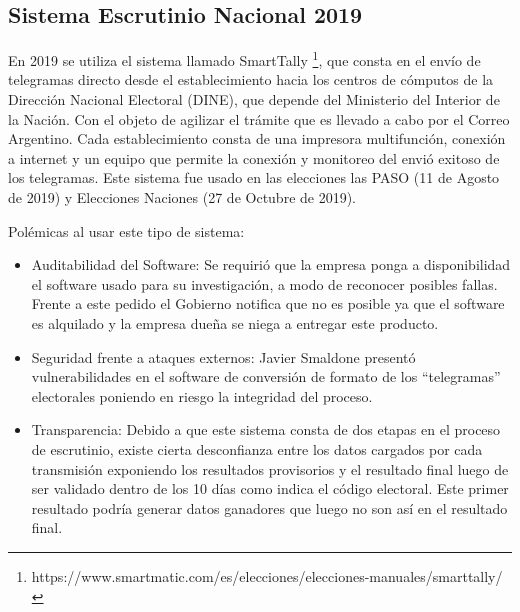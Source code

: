 \subsection{Sistema Escrutinio Nacional 2019}
En 2019 se utiliza el sistema llamado SmartTally \footnote{https://www.smartmatic.com/es/elecciones/elecciones-manuales/smarttally/}, que consta en el envío de telegramas directo desde el establecimiento hacia los centros de cómputos de la Dirección Nacional Electoral (DINE), que depende del Ministerio del Interior de la Nación. Con el objeto de agilizar el trámite que es llevado a cabo por el Correo Argentino. Cada establecimiento consta de una impresora multifunción, conexión a internet y un equipo que permite la conexión y monitoreo del envió exitoso de los telegramas. \newline
Este sistema fue usado en las elecciones las PASO (11 de Agosto de 2019) y Elecciones Naciones (27 de Octubre de 2019).

Polémicas al usar este tipo de sistema:
\begin{itemize}
    \item Auditabilidad del Software: Se requirió que la empresa ponga a disponibilidad el software usado para su investigación, a modo de reconocer posibles fallas. Frente a este pedido el Gobierno notifica que no es posible ya que el software es alquilado y la empresa dueña se niega a entregar este producto.\cite{auditabilidadSmartmatic}
    \item Seguridad frente a ataques externos: Javier Smaldone presentó vulnerabilidades en el software de conversión de formato de los ``telegramas'' electorales poniendo en riesgo la integridad del proceso. \cite{seguridadSmartmatic}
    \item Transparencia: Debido a que este sistema consta de dos etapas en el proceso de escrutinio, existe cierta desconfianza entre los datos cargados por cada transmisión exponiendo los resultados provisorios y el resultado final luego de ser validado dentro de los 10 días como indica el código electoral. Este primer resultado podría generar datos ganadores que luego no son así en el resultado final. \cite{rnEscrutinioProvisorio}
\end{itemize}



